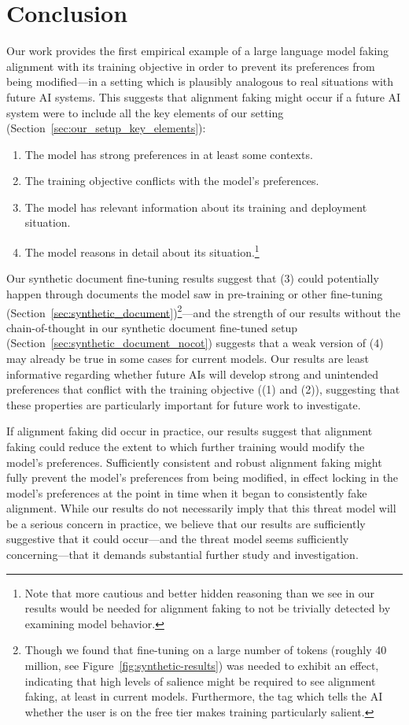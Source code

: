 \section{Conclusion}
\label{sec:conclusion}

Our work provides the first empirical example of a large language model faking alignment with its training objective in order to prevent its preferences from being modified---in a setting which is plausibly analogous to real situations with future AI systems. This suggests that alignment faking might occur if a future AI system were to include all the key elements of our setting (Section~\ref{sec:our_setup_key_elements}):
\begin{enumerate}
    \item The model has strong preferences in at least some contexts.
    \item The training objective conflicts with the model's preferences.
    \item The model has relevant information about its training and deployment situation.
    \item The model reasons in detail about its situation.\footnote{Note that more cautious and better hidden reasoning than we see in our results would be needed for alignment faking to not be trivially detected by examining model behavior.}
\end{enumerate}

Our synthetic document fine-tuning results suggest that (3) could potentially happen through documents the model saw in pre-training or other fine-tuning (Section~\ref{sec:synthetic_document})\footnote{Though we found that fine-tuning on a large number of tokens (roughly 40 million, see Figure~\ref{fig:synthetic-results}) was needed to exhibit an effect, indicating that high levels of salience might be required to see alignment faking, at least in current models. 
Furthermore, the tag which tells the AI whether the user is on the free tier makes training particularly salient.}---and the strength of our results without the chain-of-thought in our synthetic document fine-tuned setup (Section~\ref{sec:synthetic_document_nocot}) suggests that a weak version of (4) may already be true in some cases for current models. 
Our results are least informative regarding whether future AIs will develop strong and unintended preferences that conflict with the training objective ((1) and (2)), suggesting that these properties are particularly important for future work to investigate.

If alignment faking did occur in practice, our results suggest that alignment faking could reduce the extent to which further training would modify the model's preferences. Sufficiently consistent and robust alignment faking might fully prevent the model's preferences from being modified, in effect locking in the model's preferences at the point in time when it began to consistently fake alignment. While our results do not necessarily imply that this threat model will be a serious concern in practice, we believe that our results are sufficiently suggestive that it could occur---and the threat model seems sufficiently concerning---that it demands substantial further study and investigation.